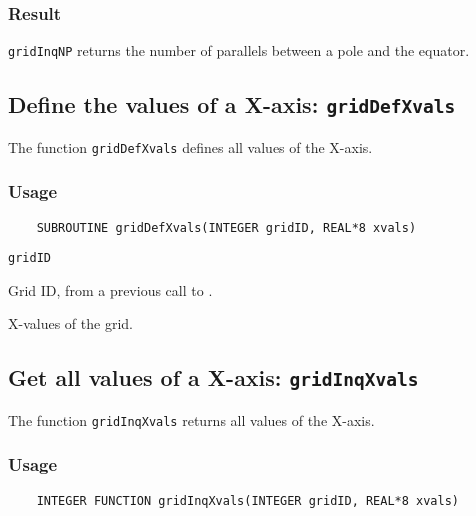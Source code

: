 \subsubsection*{Result}

{\tt gridInqNP} returns the number of parallels between a pole and the equator.



\subsection{Define the values of a X-axis: {\tt gridDefXvals}}
\label{gridDefXvals}

The function {\tt gridDefXvals} defines all values of the X-axis.

\subsubsection*{Usage}

\begin{verbatim}
    SUBROUTINE gridDefXvals(INTEGER gridID, REAL*8 xvals)
\end{verbatim}

\hspace*{4mm}\begin{minipage}[]{15cm}
\begin{deflist}{\tt gridID\ }
\item[{\tt gridID}]
Grid ID, from a previous call to {}.
\item[{\tt xvals}]
X-values of the grid.

\end{deflist}
\end{minipage}


\subsection{Get all values of a X-axis: {\tt gridInqXvals}}
\label{gridInqXvals}

The function {\tt gridInqXvals} returns all values of the X-axis.

\subsubsection*{Usage}

\begin{verbatim}
    INTEGER FUNCTION gridInqXvals(INTEGER gridID, REAL*8 xvals)
\end{verbatim}


